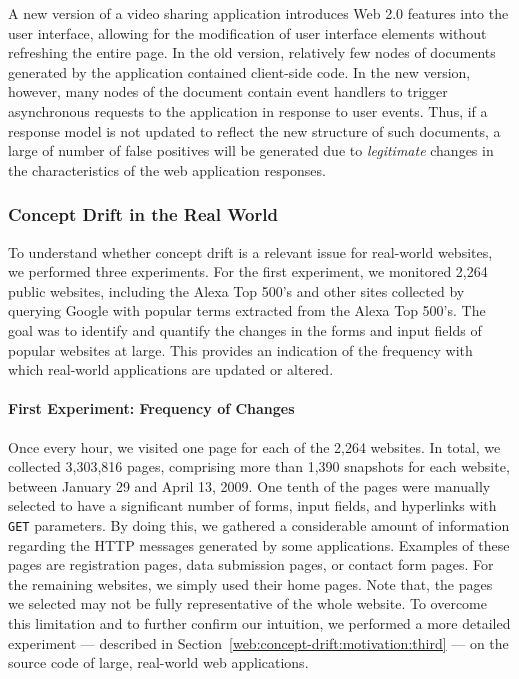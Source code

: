 \begin{example}
  A new version of a video sharing application introduces Web 2.0 features into the user interface, allowing for the modification of user interface elements without refreshing the entire page.  In the old version, relatively few nodes of documents generated by the application contained client-side code. In the new version, however, many nodes of the document contain event handlers to trigger asynchronous requests to the application in response to user events. Thus, if a response model is not updated to reflect the new structure of such documents, a large of number of false positives will be generated due to \emph{legitimate} changes in the characteristics of the web application responses.
\end{example}

\subsubsection{Concept Drift in the Real World}
\label{web:conceptdrift:motivation:prevalence}
To understand whether concept drift is a relevant issue for real-world websites, we performed three experiments.  For the first experiment, we monitored 2,264 public websites, including the \textsf{Alexa} Top 500's and other sites collected by querying \textsf{Google} with popular terms extracted from the \textsf{Alexa} Top 500's. The goal was to identify and quantify the changes in the forms and input fields of popular websites at large. This provides an indication of the frequency with which real-world applications are updated or altered.

\paragraph{First Experiment: Frequency of Changes}
Once every hour, we visited one page for each of the 2,264
websites. In total, we collected 3,303,816 pages, comprising more than
1,390 snapshots for each website, between January 29 and April 13,
2009. One tenth of the pages were manually selected to have a
significant number of forms, input fields, and hyperlinks with
\texttt{GET} parameters. By doing this, we gathered a considerable
amount of information regarding the \ac{HTTP} messages
generated by some applications. Examples of these pages are
registration pages, data submission pages, or contact form pages. For
the remaining websites, we simply used their home pages. Note that,
the pages we selected may not be fully representative of the whole
website. To overcome this limitation and to further confirm our
intuition, we performed a more detailed experiment --- described in
Section~\ref{web:concept-drift:motivation:third} --- on the source
code of large, real-world web applications.

